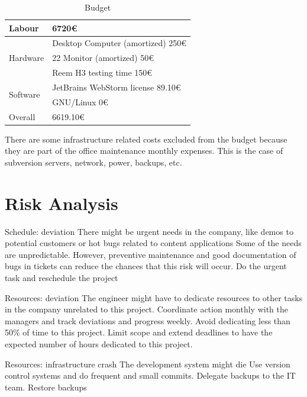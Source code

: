 \begin{table}[ht]
    \centering
    \begin{tabular}{| l | l |}
    \hline
    Labour & 6720\euro{} \\ \hline
    \multirow{3}{*}{Hardware} 
        & Desktop Computer (amortized) 250\euro{} \\ %
        & 22 Monitor (amortized) 50\euro{} \\
        & Reem H3 testing time 150\euro{} \\ \hline   
    \multirow{2}{*}{Software}
        & JetBrains WebStorm license 89.10\euro{} \\ %
        & GNU/Linux 0\euro{} \\ \hline
     Overall & 6619.10\euro{} \\ 
     \hline
    \end{tabular}
    \caption{Budget}
    \label{tab:budget}
\end{table}

There are some infrastructure related costs excluded from the budget because they are part of the office maintenance monthly expenses.
This is the case of subversion servers, network, power, backups, etc. 

\section{Risk Analysis}
\label{sec:risk}
\begin{risk}
{Schedule: deviation}
{There might be urgent needs in the company, like demos to potential customers or hot bugs related to content applications}
{Some of the needs are unpredictable. However, preventive maintenance and good documentation of bugs in tickets can reduce the chances that this risk will occur.}
{Do the urgent task and reschedule the project}
\end{risk}

\begin{risk}
{Resources: deviation}
{The engineer might have to dedicate resources to other tasks in the company unrelated to this project.}
{Coordinate action monthly with the managers and track deviations and progress weekly. Avoid dedicating less than 50\% of time to this project.}
{Limit scope and extend deadlines to have the expected number of hours dedicated to this project.}
\end{risk}

\begin{risk}
{Resources: infrastructure crash}
{The development system might die}
{Use version control systems and do frequent and small commits. Delegate backups to the IT team.}
{Restore backups}
\end{risk}

